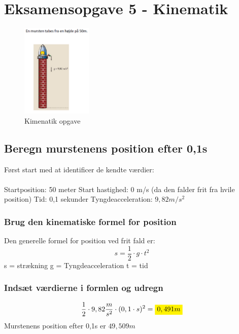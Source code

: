 \newpage
\section{Eksamensopgave 5 - Kinematik}
\begin{figure}[h!]
    \centering
    \includegraphics[width=0.3\textwidth]{figures/kinematik.png}
    \caption{Kimenatik opgave}
\end{figure}

\subsection{Beregn murstenens position efter 0,1s}
Først start med at identificer de kendte værdier:
\\\\
Startposition: 50 meter \newline
Start hastighed: 0 m/s (da den falder frit fra hvile position)\newline
Tid: 0,1 sekunder \newline
Tyngdeacceleration: \begin{math}9,82m/s^{2}\end{math}


\subsubsection{Brug den kinematiske formel for position}
Den generelle formel for position ved frit fald er:
\begin{equation*}
    s= \frac{1}{2} \cdot g \cdot t^{2}
\end{equation*}
s = strækning\newline
g = Tyngdeacceleration\newline
t = tid

\subsubsection{Indsæt værdierne i formlen og udregn}
\begin{equation*}
    \frac{1}{2} \cdot 9,82 \frac{m}{s^{2}}\cdot (0,1 \cdot s)^{2}= \mathcolorbox{yellow}{0,491m}
\end{equation*}
Murstenens position efter 0,1s er $49,509m$

